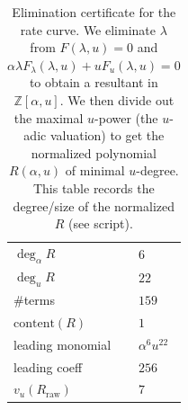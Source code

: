\begin{table}[H]
\centering
\scriptsize
\setlength{\tabcolsep}{6pt}
\caption{Elimination certificate for the rate curve. We eliminate $\lambda$ from $F(\lambda,u)=0$ and $\alpha\lambda F_{\lambda}(\lambda,u)+uF_u(\lambda,u)=0$ to obtain a resultant in $\mathbb{Z}[\alpha,u]$. We then divide out the maximal $u$-power (the $u$-adic valuation) to get the normalized polynomial $R(\alpha,u)$ of minimal $u$-degree. This table records the degree/size of the normalized $R$ (see script).}
\label{tab:sync_kernel_rate_curve_resultant_degree}
\begin{tabular}{l l}
\toprule
$\deg_{\alpha} R$ & $6$\\
$\deg_{u} R$ & $22$\\
\#terms & $159$\\
$\mathrm{content}(R)$ & $1$\\
leading monomial & $\alpha^{6}u^{22}$\\
leading coeff & $256$\\
$v_u(R_{\mathrm{raw}})$ & $7$\\
\bottomrule
\end{tabular}
\end{table}
